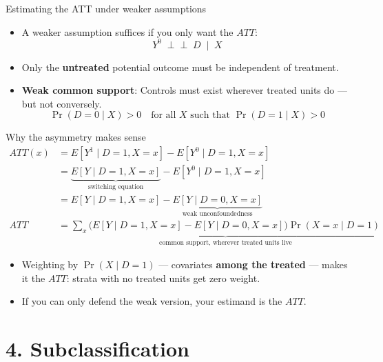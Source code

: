 \documentclass[
  11pt,
  ignorenonframetext,
  aspectratio=169,
]{beamer}
\providecommand{\tightlist}{%
  \setlength{\itemsep}{0pt}\setlength{\parskip}{0pt}}
\newcommand{\indep}{\perp\!\!\!\perp}
\begin{document}
\begin{frame}{Estimating the ATT under weaker assumptions}
\protect{}\label{estimating-the-att-under-weaker-assumptions}
\begin{itemize}
\tightlist
\item
  A weaker assumption suffices if you only want the \(ATT\): \[
  Y^0 \;\indep\; D \;\mid\; X
  \]
\item
  Only the \textbf{untreated} potential outcome must be independent of
  treatment.
\item
  \textbf{Weak common support}: Controls must exist wherever treated
  units do --- but not conversely. \[
  \Pr(D = 0 \mid X) > 0 \quad \text{for all } X \text{ such that }
  \Pr(D = 1 \mid X) > 0 
  \]
\end{itemize}
\end{frame}

\begin{frame}{Why the asymmetry makes sense}
\protect{}\label{why-the-asymmetry-makes-sense}
\[
\begin{aligned}
ATT(x) &= E[Y^1 \mid D{=}1, X{=}x] - E[Y^0 \mid D{=}1, X{=}x] \\[0.3em]
       &= \underbrace{E[Y \mid D{=}1, X{=}x]}_{\text{switching equation}} - E[Y^0 \mid D{=}1, X{=}x] \\[0.3em]
       &= E[Y \mid D{=}1, X{=}x] - \underbrace{E[Y \mid D{=}0, X{=}x]}_{\text{weak unconfoundedness}} \\[0.4em]
ATT    &= \underbrace{\sum_x \Big( E[Y \mid D{=}1, X{=}x] - E[Y \mid D{=}0, X{=}x] \Big)\Pr(X{=}x \mid D{=}1)}_{\text{common support, wherever treated units live}}
\end{aligned}
\]

\begin{itemize}
\tightlist
\item
  Weighting by \(\Pr(X \mid D{=}1)\) --- covariates \textbf{among the
  treated} --- makes it the \(ATT\): strata with no treated units get
  zero weight.
\item
  If you can only defend the weak version, your estimand is the \(ATT\).
\end{itemize}
\end{frame}

\section{4. Subclassification}\label{subclassification}
\end{document}
